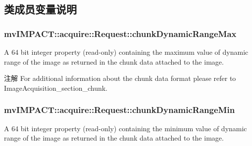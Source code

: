 \subsection{类成员变量说明}
\hypertarget{classmv_i_m_p_a_c_t_1_1acquire_1_1_request_a093f5ff03d40b74691acd10724f66885}{
\subsubsection[{chunk\+Dynamic\+Range\+Max}]{ mv\+I\+M\+P\+A\+C\+T\+::acquire\+::\+Request\+::chunk\+Dynamic\+Range\+Max}}\label{classmv_i_m_p_a_c_t_1_1acquire_1_1_request_a093f5ff03d40b74691acd10724f66885}


A 64 bit integer property {\bfseries }(read-\/only) containing the maximum value of dynamic range of the image as returned in the chunk data attached to the image. 

\begin{DoxyNote}{注解}
For additional information about the chunk data format please refer to Image\+Acquisition\+\_\+section\+\_\+chunk. 
\end{DoxyNote}
\hypertarget{classmv_i_m_p_a_c_t_1_1acquire_1_1_request_ada6f72ff16650724cfd26d8048673081}{
\subsubsection[{chunk\+Dynamic\+Range\+Min}]{ mv\+I\+M\+P\+A\+C\+T\+::acquire\+::\+Request\+::chunk\+Dynamic\+Range\+Min}}\label{classmv_i_m_p_a_c_t_1_1acquire_1_1_request_ada6f72ff16650724cfd26d8048673081}


A 64 bit integer property {\bfseries }(read-\/only) containing the minimum value of dynamic range of the image as returned in the chunk data attached to the image. 

